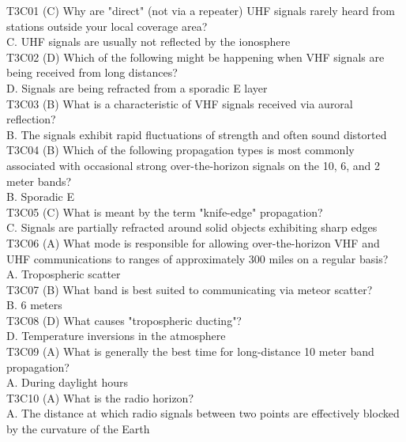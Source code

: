 \documentclass[12pt,letterpaper]{report}
\begin{document}
T3C01 (C) Why are "direct" (not via a repeater) UHF signals rarely heard from stations outside your local coverage area?\\
C. UHF signals are usually not reflected by the ionosphere\\

T3C02 (D) Which of the following might be happening when VHF signals are being received from long distances?\\
D. Signals are being refracted from a sporadic E layer\\

T3C03 (B) What is a characteristic of VHF signals received via auroral reflection?\\
B. The signals exhibit rapid fluctuations of strength and often sound distorted\\

T3C04 (B) Which of the following propagation types is most commonly associated with occasional strong over-the-horizon signals on the 10, 6, and 2 meter bands?\\
B. Sporadic E\\

T3C05 (C) What is meant by the term "knife-edge" propagation?\\
C. Signals are partially refracted around solid objects exhibiting sharp edges\\

T3C06 (A) What mode is responsible for allowing over-the-horizon VHF and UHF communications to ranges of approximately 300 miles on a regular basis?\\
A. Tropospheric scatter\\

T3C07 (B) What band is best suited to communicating via meteor scatter?\\
B. 6 meters\\

T3C08 (D) What causes "tropospheric ducting"?\\
D. Temperature inversions in the atmosphere\\

T3C09 (A) What is generally the best time for long-distance 10 meter band propagation?\\
A. During daylight hours\\

T3C10 (A) What is the radio horizon?\\
A. The distance at which radio signals between two points are effectively blocked by the curvature of the Earth\\
\end{document}
